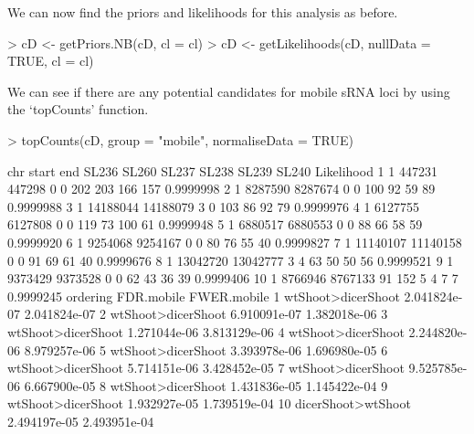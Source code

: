 \documentclass[a4paper]{article}
\begin{document}
We can now find the priors and likelihoods for this analysis as before.

\begin{Schunk}
\begin{Sinput}
> cD <- getPriors.NB(cD, cl = cl)
> cD <- getLikelihoods(cD, nullData = TRUE, cl = cl)
\end{Sinput}
\end{Schunk}

We can see if there are any potential candidates for mobile sRNA loci by using the `topCounts' function.
\begin{Schunk}
\begin{Sinput}
> topCounts(cD, group = "mobile", normaliseData = TRUE)  
\end{Sinput}
\begin{Soutput}
   chr    start      end SL236 SL260 SL237 SL238 SL239 SL240 Likelihood
1    1   447231   447298     0     0   202   203   166   157  0.9999998
2    1  8287590  8287674     0     0   100    92    59    89  0.9999988
3    1 14188044 14188079     3     0   103    86    92    79  0.9999976
4    1  6127755  6127808     0     0   119    73   100    61  0.9999948
5    1  6880517  6880553     0     0    88    66    58    59  0.9999920
6    1  9254068  9254167     0     0    80    76    55    40  0.9999827
7    1 11140107 11140158     0     0    91    69    61    40  0.9999676
8    1 13042720 13042777     3     4    63    50    50    56  0.9999521
9    1  9373429  9373528     0     0    62    43    36    39  0.9999406
10   1  8766946  8767133    91   152     5     4     7     7  0.9999245
             ordering   FDR.mobile  FWER.mobile
1  wtShoot>dicerShoot 2.041824e-07 2.041824e-07
2  wtShoot>dicerShoot 6.910091e-07 1.382018e-06
3  wtShoot>dicerShoot 1.271044e-06 3.813129e-06
4  wtShoot>dicerShoot 2.244820e-06 8.979257e-06
5  wtShoot>dicerShoot 3.393978e-06 1.696980e-05
6  wtShoot>dicerShoot 5.714151e-06 3.428452e-05
7  wtShoot>dicerShoot 9.525785e-06 6.667900e-05
8  wtShoot>dicerShoot 1.431836e-05 1.145422e-04
9  wtShoot>dicerShoot 1.932927e-05 1.739519e-04
10 dicerShoot>wtShoot 2.494197e-05 2.493951e-04
\end{Soutput}
\end{Schunk}
\end{document}
